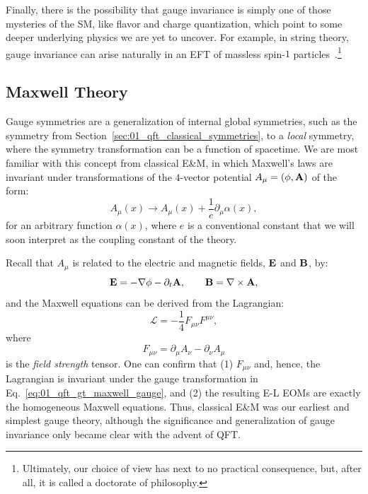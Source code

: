 Finally, there is the possibility that gauge invariance is simply one of those mysteries of the SM, like flavor and charge quantization, which point to some deeper underlying physics we are yet to uncover.
For example, in string theory, gauge invariance can arise naturally in an EFT of massless spin-$1$ particles~\cite{Green:1987sp}.\footnote{Ultimately, our choice of view has next to no practical consequence, but, after all, it is called a doctorate of philosophy.}


\subsection{Maxwell Theory}
\label{sec:01_qft_gt_maxwell}

Gauge symmetries are a generalization of internal global symmetries, such as the \UU[1] symmetry from Section~\ref{sec:01_qft_classical_symmetries}, to a \textit{local} symmetry, where the symmetry transformation can be a function of spacetime.
We are most familiar with this concept from classical E\&M, in which Maxwell's laws are invariant under transformations of the $4$-vector potential $A_\mu = (\phi, \mathbf{A})$ of the form:
\begin{equation}
	\label{eq:01_qft_gt_maxwell_gauge}
	A_\mu(x) \rightarrow A_\mu(x) + \frac{1}{e}\partial_\mu\alpha(x),
\end{equation}
for an arbitrary function $\alpha(x)$, where $e$ is a conventional constant that we will soon interpret as the coupling constant of the theory.

Recall that $A_\mu$ is related to the electric and magnetic fields, $\mathbf{E}$ and $\mathbf{B}$, by:
\begin{equation}
	\label{eq:01_qft_gt_maxwell_fields}
	\mathbf{E} = -\nabla\phi - \partial_t\mathbf{A}, \qquad \mathbf{B} = \nabla\times\mathbf{A},
\end{equation}
and the Maxwell equations can be derived from the Lagrangian:
\begin{equation}
	\label{eq:01_qft_gt_maxwell_lagrangian}
	\mathcal L = -\frac{1}{4}F_{\mu\nu}F^{\mu\nu},
\end{equation}
where
\begin{equation}
	\label{eq:01_qft_gt_maxwell_field_strength}
	F_{\mu\nu} = \partial_\mu A_\nu - \partial_\nu A_\mu
\end{equation}
is the \textit{field strength} tensor.
One can confirm that (1) $F_{\mu\nu}$ and, hence, the Lagrangian is invariant under the gauge transformation in Eq.~\ref{eq:01_qft_gt_maxwell_gauge}, and (2) the resulting E-L EOMs are exactly the homogeneous Maxwell equations.
Thus, classical E\&M was our earliest and simplest gauge theory, although the significance and generalization of gauge invariance only became clear with the advent of QFT.

